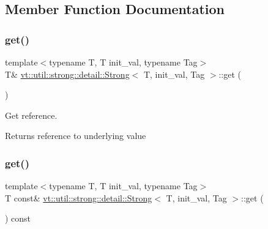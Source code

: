 \subsection{Member Function Documentation}
\mbox{\label{structvt_1_1util_1_1strong_1_1detail_1_1_strong_a111bcf44f59fcedcecf4eb59fcb11460}} 
\subsubsection{\texorpdfstring{get()}{get()}\hspace{0.1cm}{\footnotesize\ttfamily [1/2]}}
{\footnotesize\ttfamily template$<$typename T, T init\+\_\+val, typename Tag$>$ \\
T\& \hyperlink{structvt_1_1util_1_1strong_1_1detail_1_1_strong}{vt\+::util\+::strong\+::detail\+::\+Strong}$<$ T, init\+\_\+val, Tag $>$\+::get (\begin{DoxyParamCaption}{ }\end{DoxyParamCaption})\hspace{0.3cm}{\ttfamily [inline]}}



Get reference. 

\begin{DoxyReturn}{Returns}
reference to underlying value 
\end{DoxyReturn}
\mbox{\label{structvt_1_1util_1_1strong_1_1detail_1_1_strong_aa84e50fbeaefbb74fb8843a3fb1368a7}} 
\subsubsection{\texorpdfstring{get()}{get()}\hspace{0.1cm}{\footnotesize\ttfamily [2/2]}}
{\footnotesize\ttfamily template$<$typename T, T init\+\_\+val, typename Tag$>$ \\
T const\& \hyperlink{structvt_1_1util_1_1strong_1_1detail_1_1_strong}{vt\+::util\+::strong\+::detail\+::\+Strong}$<$ T, init\+\_\+val, Tag $>$\+::get (\begin{DoxyParamCaption}{ }\end{DoxyParamCaption}) const\hspace{0.3cm}{\ttfamily [inline]}}



